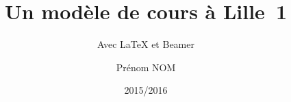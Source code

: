 \title{Un modèle de cours à Lille~1}
\subtitle{Avec \LaTeX{} et Beamer}
\author{Prénom NOM}
\date{2015/2016}
